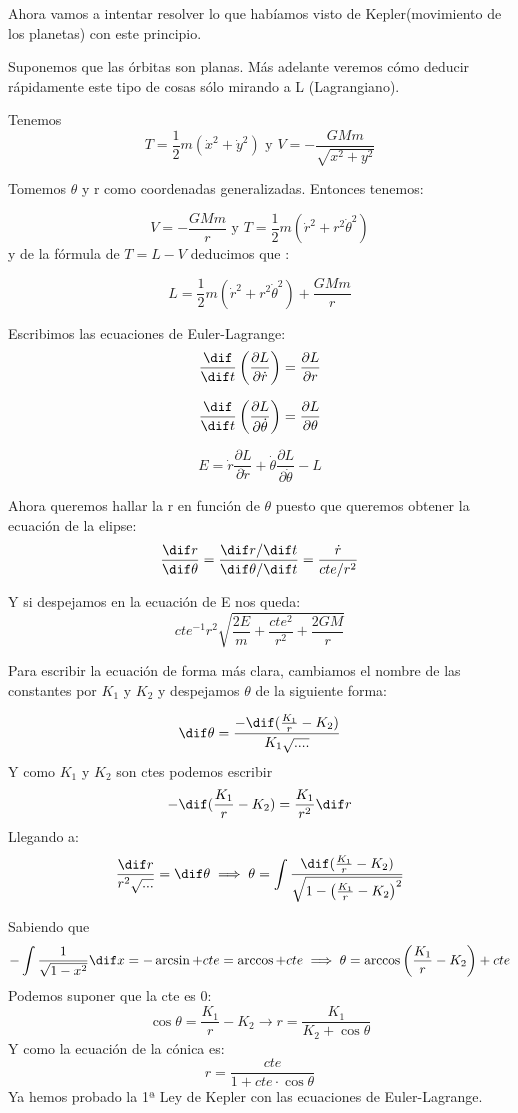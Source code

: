 \begin{example}
	Ahora vamos a intentar resolver lo que habíamos visto de Kepler(movimiento de los planetas) con este principio.

Suponemos que las órbitas son planas. Más adelante veremos cómo deducir rápidamente este tipo de cosas sólo mirando a L (Lagrangiano).

Tenemos
\[T = \frac{1}{2} m(\dot x^2 + \dot y^2) \text{ y }V = -\frac{GMm}{\sqrt{x^2 + y^2}}\]

Tomemos $\theta$ y r como coordenadas generalizadas. Entonces tenemos:


$$V= -\frac{GMm}{r}\text{ y } T= \frac{1}{2} m (\dot r^2 + r^2 \dot\theta^2)$$
y de la fórmula de $T= L-V$ deducimos que :

$$L = \frac{1}{2} m (\dot r^2 + r^2 \dot\theta^2) + \frac{GMm}{r}$$

Escribimos las ecuaciones de Euler-Lagrange:
$$\frac{\dif}{\dif t}\left(\frac{\partial L}{\partial \dot r}\right)= \frac{\partial L}{\partial r}$$

$$\frac{\dif}{\dif t}\left(\frac{\partial L}{\partial \dot \theta}\right)= \frac{\partial L}{\partial \theta}$$

$$E= \dot r \frac{\partial L}{\partial \dot r} + \dot{\theta }\frac{\partial L}{\partial \dot{\theta}} - L$$

Ahora queremos hallar la r en función de $\theta$ puesto que queremos obtener la ecuación de la elipse:
$$\frac{\dif r}{\dif \theta} = \frac{\dif r / \dif t}{\dif \theta / \dif t}= \frac{\dot r}{cte/r^2} $$

Y si despejamos en la ecuación de E nos queda: $$cte^{-1}r^2\sqrt{\frac{2E}{m}+\frac{cte^2}{r^2}+\frac{2GM}{r}}$$

Para escribir la ecuación de forma más clara, cambiamos el nombre de las constantes por $K_1$ y $K_2$ y despejamos $\theta$ de la siguiente forma:

\[\dif \theta = \frac{-\dif(\frac{K_1}{r} - K_2)}{K_1 \sqrt{....}}\]
Y como $K_1$ y $K_2$ son ctes podemos escribir
\[-\dif(\frac{K_1}{r} - K_2) = \frac{K_1}{r^2}\dif r\]
Llegando a:
$$ \frac{\dif r}{r^2\sqrt{...}}=\dif \theta \implies \theta = \int \frac{\dif ( \frac{K_1}{r} - K_2 )}{\sqrt{1 - \left(\frac{K_1}{r} - K_2\right)^2}}$$

Sabiendo que
$$- \int \frac{1}{\sqrt{1-x^2}}\dif x = -\arcsin + cte = \arccos + cte \implies \theta = \arccos \left( \frac{K_1}{r} - K_2\right) + cte$$
Podemos suponer que la cte es 0:
$$ \cos\theta = \frac{K_1}{r} - K_2 \rightarrow r = \frac{K_1}{K_2 + \cos\theta}$$
Y como la ecuación de la cónica es:
$$ r = \frac{cte}{1 + cte \cdot \cos\theta}$$
Ya hemos probado la 1ª Ley de Kepler con las ecuaciones de Euler-Lagrange.\\
\end{example}

